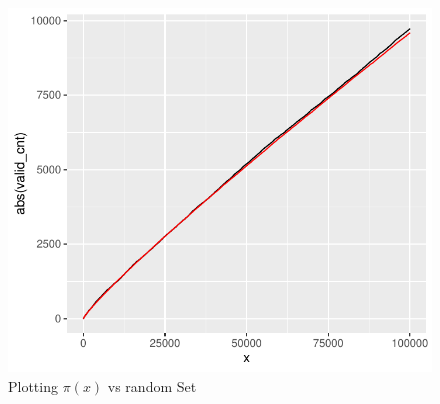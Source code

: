 \documentclass{article}
\begin{document}
\begin{figure}
\label{fig:random_set}
\includegraphics{random_set}
\caption{Plotting $\pi(x)$ vs random Set}
\end{figure}
\end{document}
